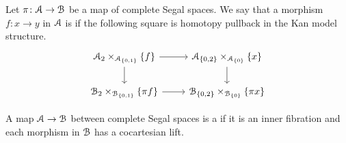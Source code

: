 \documentclass[main.tex]{subfiles}
\begin{document}
\begin{definition}
  Let $\pi\colon \mathcal{A} \to \mathcal{B}$ be a map of complete Segal spaces. We say that a morphism $f\colon x \to y$ in $\mathcal{A}$ is  if the following square is homotopy pullback in the Kan model structure.
  \begin{equation*}
    \begin{tikzcd}
      \category{A}_{2} \times_{\category{A}_{\{0, 1\}}} \{f\}
      \arrow[r]
      \arrow[d]
      & \category{A}_{\{0,2\}} \times_{\category{A}_{\{0\}}} \{x\}
      \arrow[d]
      \\
      \category{B}_{2} \times_{\category{B}_{\{0, 1\}}} \{\pi f\}
      \arrow[r]
      & \category{B}_{\{0, 2\}} \times_{\category{B}_{\{0\}}} \{\pi x\}
    \end{tikzcd}
  \end{equation*}
\end{definition}

\begin{definition}
  A map $\mathcal{A} \to \mathcal{B}$ between complete Segal spaces is a  if it is an inner fibration and each morphism in $\mathcal{B}$ has a cocartesian lift.
\end{definition}

%
%
\end{document}
